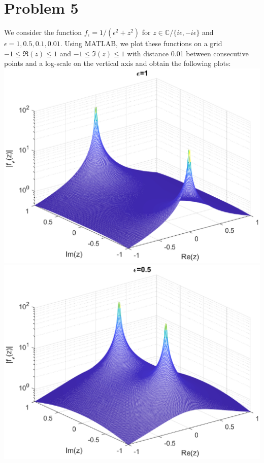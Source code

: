 \documentclass{article}
\begin{document}
\section{Problem 5}
We consider the function $f_\epsilon=1/(\epsilon^2+z^2)$ for $z\in\mathbb{C}/\{i\epsilon,-i\epsilon\}$ and $\epsilon=1,0.5,0.1,0.01$. Using MATLAB, we plot these functions on a grid $-1\leq\Re (z)\leq1$ and $-1\leq\Im (z)\leq1$ with distance 0.01 between consecutive points and a log-scale on the vertical axis and obtain the following plots:\\
\includegraphics[scale=0.55]{1.eps}
\includegraphics[scale=0.55]{2.eps}
\end{document}
